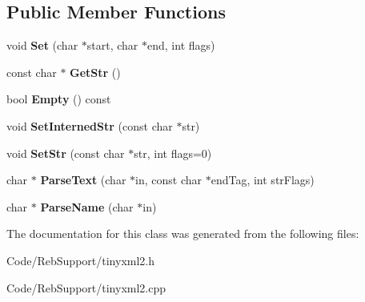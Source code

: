 \subsection*{Public Member Functions}
\begin{DoxyCompactItemize}
\item 
void {\bfseries Set} (char $\ast$start, char $\ast$end, int flags)\hypertarget{classtinyxml2_1_1_str_pair_a4f05549373394266a1eecba26813c166}{}\label{classtinyxml2_1_1_str_pair_a4f05549373394266a1eecba26813c166}

\item 
const char $\ast$ {\bfseries Get\+Str} ()\hypertarget{classtinyxml2_1_1_str_pair_ad87e3d11330f5e689ba1e7e54c023b57}{}\label{classtinyxml2_1_1_str_pair_ad87e3d11330f5e689ba1e7e54c023b57}

\item 
bool {\bfseries Empty} () const \hypertarget{classtinyxml2_1_1_str_pair_affa1043e73a18f05d5d2faec055725a7}{}\label{classtinyxml2_1_1_str_pair_affa1043e73a18f05d5d2faec055725a7}

\item 
void {\bfseries Set\+Interned\+Str} (const char $\ast$str)\hypertarget{classtinyxml2_1_1_str_pair_a2baf6230e18333e02ab65d0897ee3941}{}\label{classtinyxml2_1_1_str_pair_a2baf6230e18333e02ab65d0897ee3941}

\item 
void {\bfseries Set\+Str} (const char $\ast$str, int flags=0)\hypertarget{classtinyxml2_1_1_str_pair_a1f82ec6b5bee35ee7466d8565e43b1de}{}\label{classtinyxml2_1_1_str_pair_a1f82ec6b5bee35ee7466d8565e43b1de}

\item 
char $\ast$ {\bfseries Parse\+Text} (char $\ast$in, const char $\ast$end\+Tag, int str\+Flags)\hypertarget{classtinyxml2_1_1_str_pair_ad90521f188e9606a8fbafe5d86fb2246}{}\label{classtinyxml2_1_1_str_pair_ad90521f188e9606a8fbafe5d86fb2246}

\item 
char $\ast$ {\bfseries Parse\+Name} (char $\ast$in)\hypertarget{classtinyxml2_1_1_str_pair_aa6d8998efceba41d87ec2300c70a6085}{}\label{classtinyxml2_1_1_str_pair_aa6d8998efceba41d87ec2300c70a6085}

\end{DoxyCompactItemize}


The documentation for this class was generated from the following files\+:\begin{DoxyCompactItemize}
\item 
Code/\+Reb\+Support/tinyxml2.\+h\item 
Code/\+Reb\+Support/tinyxml2.\+cpp\end{DoxyCompactItemize}
